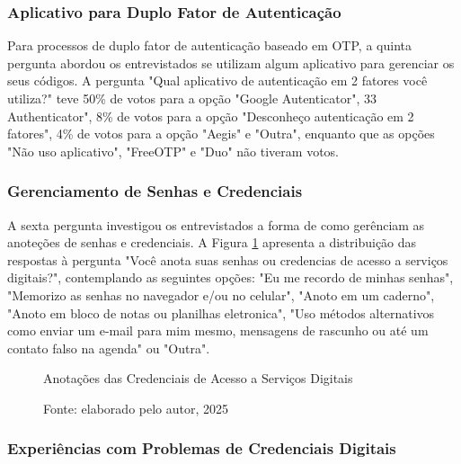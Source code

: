 \documentclass[12pt]{article}
\begin{document}
\subsubsection{Aplicativo para Duplo Fator de Autenticação}

Para processos de duplo fator de autenticação baseado em OTP, a quinta pergunta
abordou os entrevistados se utilizam algum aplicativo para gerenciar os seus códigos.
A pergunta "Qual aplicativo de autenticação em 2 fatores você utiliza?" teve 50\% de
votos para a opção "Google Autenticator", 33%
Authenticator", 8\% de votos para a opção "Desconheço autenticação em 2 fatores", 4\%
de votos para a opção "Aegis" e "Outra", enquanto que as opções "Não uso aplicativo",
"FreeOTP" e "Duo" não tiveram votos.

\subsubsection{Gerenciamento de Senhas e Credenciais}

A sexta pergunta investigou os entrevistados a forma de como gerênciam as
anoteções de senhas e credenciais.
A Figura \ref{fig:resposta_6} apresenta a distribuição das respostas à pergunta
"Você anota suas senhas ou credencias de acesso a serviços digitais?",
contemplando as seguintes opções: "Eu me recordo de minhas senhas", "Memorizo
as senhas no navegador e/ou no celular", "Anoto em um caderno", "Anoto em bloco
de notas ou planilhas eletronica", "Uso métodos alternativos como enviar um
e-mail para mim mesmo, mensagens de rascunho ou até um contato falso na agenda"
ou "Outra".

\begin{figure}[!htbp]
  \centering
  \caption{Anotações das Credenciais de Acesso a Serviços Digitais}
  \caption*{Fonte: elaborado pelo autor, 2025}
  \label{fig:resposta_6}
\end{figure}
\FloatBarrier

\subsubsection{Experiências com Problemas de Credenciais Digitais}
\end{document}
